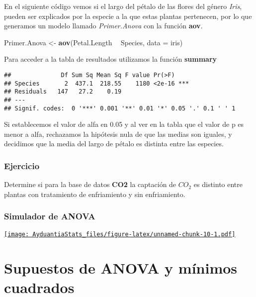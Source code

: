 \documentclass[]{book}
\newenvironment{Shaded}{\begin{snugshade}}{\end{snugshade}}
\newcommand{\DataTypeTok}[1]{\textcolor[rgb]{0.13,0.29,0.53}{#1}}
\newcommand{\KeywordTok}[1]{\textcolor[rgb]{0.13,0.29,0.53}{\textbf{#1}}}
\newcommand{\NormalTok}[1]{#1}
\newcommand{\OperatorTok}[1]{\textcolor[rgb]{0.81,0.36,0.00}{\textbf{#1}}}
\newcommand{\StringTok}[1]{\textcolor[rgb]{0.31,0.60,0.02}{#1}}
\begin{document}
En el siguiente código vemos si el largo del pétalo de las flores del género \emph{Iris}, pueden ser explicados por la especie a la que estas plantas pertenecen, por lo que generamos un modelo llamado \emph{Primer.Anova} con la función \textbf{aov}.

\begin{Shaded}
\begin{Highlighting}[]
\NormalTok{Primer.Anova <-}\StringTok{ }\KeywordTok{aov}\NormalTok{(Petal.Length }\OperatorTok{~}\StringTok{ }\NormalTok{Species, }\DataTypeTok{data =}\NormalTok{ iris)}
\end{Highlighting}
\end{Shaded}

Para acceder a la tabla de resultados utilizamos la función \textbf{summary}

\begin{verbatim}
##              Df Sum Sq Mean Sq F value Pr(>F)    
## Species       2  437.1  218.55    1180 <2e-16 ***
## Residuals   147   27.2    0.19                   
## ---
## Signif. codes:  0 '***' 0.001 '**' 0.01 '*' 0.05 '.' 0.1 ' ' 1
\end{verbatim}

Si establecemos el valor de alfa en 0.05 y al ver en la tabla que el valor de p es menor a alfa, rechazamos la hipótesis nula de que las medias son iguales, y decidimos que la media del largo de pétalo es distinta entre las especies.

\hypertarget{ejercicio}{%
\subsection{Ejercicio}\label{ejercicio}}

Determine si para la base de datos \textbf{CO2} la captación de \(CO_2\) es distinto entre plantas con tratamiento de enfriamiento y sin enfriamiento.

\hypertarget{simulador-de-anova}{%
\subsection{Simulador de ANOVA}\label{simulador-de-anova}}

\href{http://admin.derek-corcoran-barrios.com/shiny/rstudio/sample-apps/Shiny2/}{\texttt{[image: AyduantiaStats\_files/figure-latex/unnamed-chunk-10-1.pdf]}}

\hypertarget{Supuestos}{%
\chapter{Supuestos de ANOVA y mínimos cuadrados}\label{Supuestos}}
\end{document}

